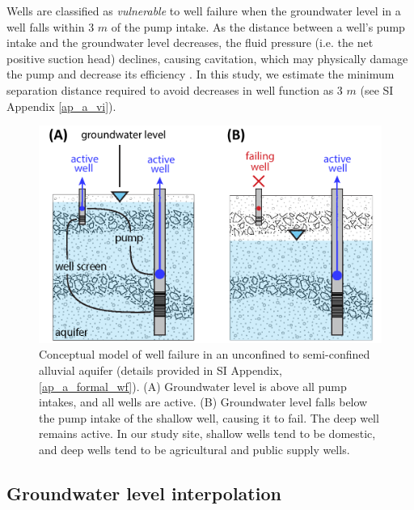 Wells are classified as \textit{vulnerable} to well failure when the groundwater level in a well falls within 3 $m$ of the pump intake. As the distance between a well's pump intake and the groundwater level decreases, the fluid pressure (i.e. the net positive suction head) declines, causing cavitation, which may physically damage the pump and decrease its efficiency \citep{Tullis1989, Helweg1983}. In this study, we estimate the minimum separation distance required to avoid decreases in well function as 3 $m$ (see SI Appendix \ref{ap_a_vi}).

\begin{figure}%
	\centering
	\includegraphics[width=\textwidth]{ch2_figs/fig_conceptual_mod.pdf}
	\caption{Conceptual model of well failure in an unconfined to semi-confined alluvial aquifer (details provided in SI Appendix, \ref{ap_a_formal_wf}). (A) Groundwater level is above all pump intakes, and all wells are active. (B) Groundwater level falls below the pump intake of the shallow well, causing it to fail. The deep well remains active. In our study site, shallow wells tend to be domestic, and deep wells tend to be agricultural and public supply wells.}
	\label{fig:conceptual_model_wf}
\end{figure}


\subsection{Groundwater level interpolation}

